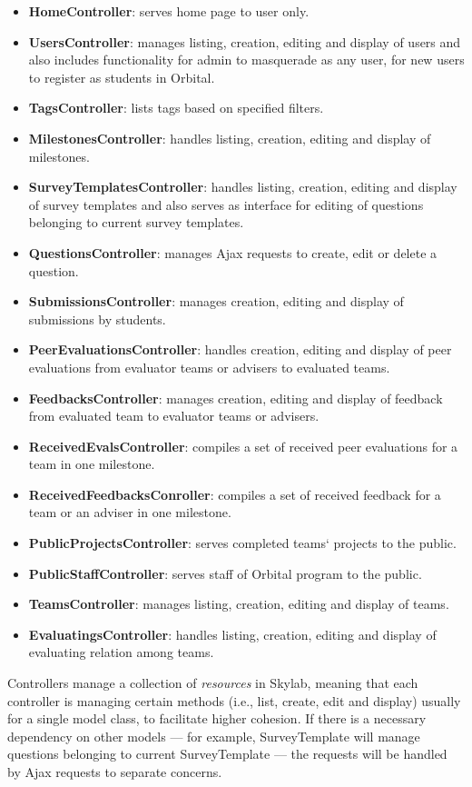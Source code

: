 \begin{itemize}
  \item \textbf{HomeController}: serves home page to user only.
  \item \textbf{UsersController}: manages listing, creation, editing and display of users and also includes functionality for admin to masquerade as any user, for new users to register as students in Orbital.
  \item \textbf{TagsController}: lists tags based on specified filters.
  \item \textbf{MilestonesController}: handles listing, creation, editing and display of milestones.
  \item \textbf{SurveyTemplatesController}: handles listing, creation, editing and display of survey templates and also serves as interface for editing of questions belonging to current survey templates. 
  \item \textbf{QuestionsController}: manages Ajax requests to create, edit or delete a question.
  \item \textbf{SubmissionsController}: manages creation, editing and display of submissions by students.
  \item \textbf{PeerEvaluationsController}: handles creation, editing and display of peer evaluations from evaluator teams or advisers to evaluated teams.
  \item \textbf{FeedbacksController}: manages creation, editing and display of feedback from evaluated team to evaluator teams or advisers.
  \item \textbf{ReceivedEvalsController}: compiles a set of received peer evaluations for a team in one milestone.
  \item \textbf{ReceivedFeedbacksConroller}: compiles a set of received feedback for a team or an adviser in one milestone.
  \item \textbf{PublicProjectsController}: serves completed teams` projects to the public.
  \item \textbf{PublicStaffController}: serves staff of Orbital program to the public.
  \item \textbf{TeamsController}: manages listing, creation, editing and display of teams.
  \item \textbf{EvaluatingsController}: handles listing, creation, editing and display of evaluating relation among teams.
\end{itemize}

Controllers manage a collection of \textit{resources} in Skylab, meaning that each controller is managing certain methods (i.e., list, create, edit and display) usually for a single model class, to facilitate higher cohesion. If there is a necessary dependency on other models --- for example, SurveyTemplate will manage questions belonging to current SurveyTemplate --- the requests will be handled by Ajax requests to separate concerns.

